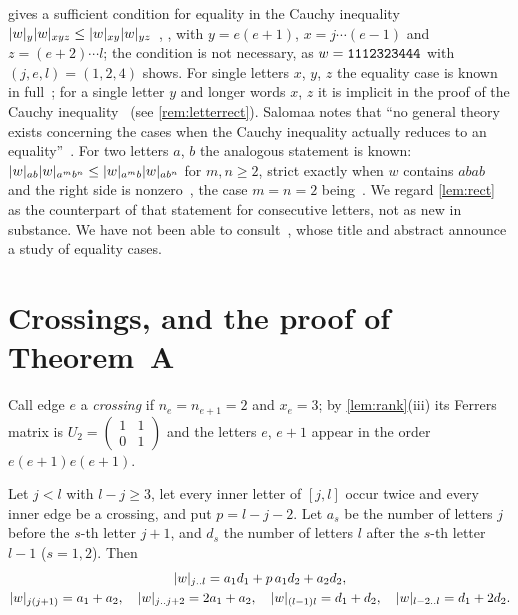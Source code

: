 \documentclass[11pt,a4paper]{article}
\newcommand{\Umat}{U}
\begin{document}
\begin{remark}\label{rem:cauchy}
 gives a sufficient condition for equality in the Cauchy inequality $\lvert w\rvert_{y}\lvert w\rvert_{xyz}\le\lvert w\rvert_{xy}\lvert w\rvert_{yz}$~\cite[Corollary~4, p.~12]{MSY04}, \cite[Theorem~4, p.~193]{Sal05}, with $y=e(e+1)$, $x=j\cdots(e-1)$ and $z=(e+2)\cdots l$; the condition is not necessary, as $w=\mathtt{1112323444}$ with $(j,e,l)=(1,2,4)$ shows. For single letters $x$, $y$, $z$ the equality case is known in full~\cite[Lemma~2, p.~12]{MSY04}; for a single letter $y$ and longer words $x$, $z$ it is implicit in the proof of the Cauchy inequality~\cite[pp.~15--16]{MSY04} (see \cref{rem:letterrect}). Salomaa notes that ``no general theory exists concerning the cases when the Cauchy inequality actually reduces to an equality''~\cite[p.~193]{Sal05}. For two letters $a$, $b$ the analogous statement is known: $\lvert w\rvert_{ab}\lvert w\rvert_{a^mb^n}\le\lvert w\rvert_{a^mb}\lvert w\rvert_{ab^n}$ for $m,n\ge2$, strict exactly when $w$ contains $abab$ and the right side is nonzero~\cite[Theorem~5, p.~195]{Sal05}, the case $m=n=2$ being~\cite[Lemma~3, p.~12]{MSY04}. We regard \cref{lem:rect} as the counterpart of that statement for consecutive letters, not as new in substance. We have not been able to consult~\cite{Sal15}, whose title and abstract announce a study of equality cases.
\end{remark}

\section{Crossings, and the proof of Theorem~A}\label{sec:main}

Call edge $e$ a \emph{crossing} if $n_e=n_{e+1}=2$ and $x_e=3$; by \cref{lem:rank}(iii) its Ferrers matrix is $\Umat_2=\left(\begin{smallmatrix}1&1\\0&1\end{smallmatrix}\right)$ and the letters $e$, $e+1$ appear in the order $e(e+1)e(e+1)$.

\begin{proposition}\label{prop:chain}
Let $j<l$ with $l-j\ge3$, let every inner letter of $[j,l]$ occur twice and every inner edge be a crossing, and put $p=l-j-2$. Let $a_s$ be the number of letters $j$ before the $s$-th letter $j+1$, and $d_s$ the number of letters $l$ after the $s$-th letter $l-1$ ($s=1,2$). Then
\begin{gather*}
\lvert w\rvert_{j\mathinner{\ldotp\ldotp} l}=a_1d_1+p\,a_1d_2+a_2d_2,\\
\lvert w\rvert_{j(j+1)}=a_1+a_2,\quad\lvert w\rvert_{j\mathinner{\ldotp\ldotp} j+2}=2a_1+a_2,\quad\lvert w\rvert_{(l-1)l}=d_1+d_2,\quad\lvert w\rvert_{l-2\mathinner{\ldotp\ldotp} l}=d_1+2d_2.
\end{gather*}
\end{proposition}
\end{document}

